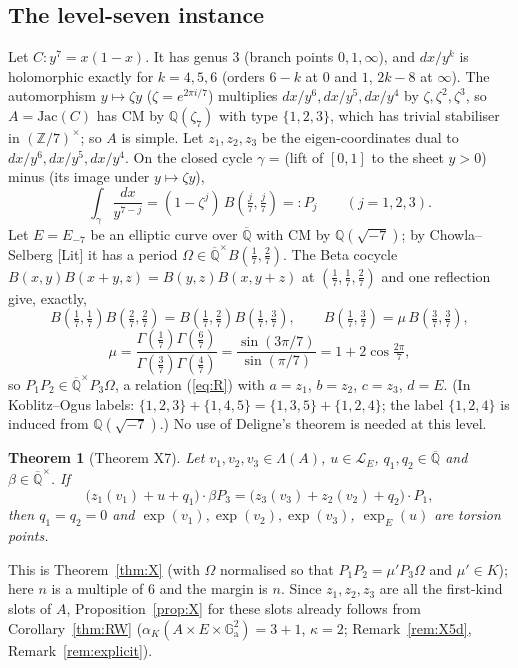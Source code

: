 \documentclass[11pt]{amsart}
\newtheorem{theorem}{Theorem}[section]
\theoremstyle{definition}
\newcommand{\Qb}{\overline{\mathbb{Q}}}
\newcommand{\Q}{\mathbb{Q}}
\newcommand{\Z}{\mathbb{Z}}
\newcommand{\Ga}{\mathbb{G}_{\mathrm a}}
\newcommand{\Lg}{\mathcal{L}}
\newcommand{\lab}[1]{\textup{[#1]}}
\begin{document}
\subsection{The level-seven instance}\label{sec:X7}
Let $C\colon y^7=x(1-x)$. It has genus $3$ (branch points $0,1,\infty$), and $dx/y^k$ is holomorphic exactly for
$k=4,5,6$ (orders $6-k$ at $0$ and $1$, $2k-8$ at $\infty$). The automorphism $y\mapsto\zeta y$ ($\zeta=e^{2\pi i/7}$)
multiplies $dx/y^6,dx/y^5,dx/y^4$ by $\zeta,\zeta^2,\zeta^3$, so $A=\mathrm{Jac}(C)$ has CM by $\Q(\zeta_7)$ with type
$\{1,2,3\}$, which has trivial stabiliser in $(\Z/7)^\times$; so $A$ is simple. Let $z_1,z_2,z_3$ be the eigen-coordinates
dual to $dx/y^6,dx/y^5,dx/y^4$. On the closed cycle $\gamma$ = (lift of $[0,1]$ to the sheet $y>0$) minus (its image under
$y\mapsto\zeta y$),
\[
\int_\gamma\frac{dx}{y^{7-j}}=(1-\zeta^{j})\,B(\tfrac j7,\tfrac j7)=:P_j\qquad(j=1,2,3).
\]
Let $E=E_{-7}$ be an elliptic curve over $\Qb$ with CM by $\Q(\sqrt{-7})$; by Chowla--Selberg \lab{Lit} \cite{Gr78} it has a period
$\Omega\in\Qb^\times B(\tfrac17,\tfrac27)$. The Beta cocycle $B(x,y)B(x+y,z)=B(y,z)B(x,y+z)$ at $(\tfrac17,\tfrac17,\tfrac27)$
and one reflection give, exactly,
\[
B(\tfrac17,\tfrac17)B(\tfrac27,\tfrac27)=B(\tfrac17,\tfrac27)B(\tfrac17,\tfrac37),\qquad
B(\tfrac17,\tfrac37)=\mu\,B(\tfrac37,\tfrac37),
\]
\[
\mu=\frac{\Gamma(\frac17)\Gamma(\frac67)}{\Gamma(\frac37)\Gamma(\frac47)}=\frac{\sin(3\pi/7)}{\sin(\pi/7)}=1+2\cos\tfrac{2\pi}7,
\]
so $P_1P_2\in\Qb^\times P_3\Omega$, a relation (\ref{eq:R}) with $a=z_1$, $b=z_2$, $c=z_3$, $d=E$. (In Koblitz--Ogus labels:
$\{1,2,3\}+\{1,4,5\}=\{1,3,5\}+\{1,2,4\}$; the label $\{1,2,4\}$ is induced from $\Q(\sqrt{-7})$.) No use of Deligne's theorem
is needed at this level.

\begin{theorem}[Theorem X7]\label{thm:X7}
Let $v_1,v_2,v_3\in\Lambda(A)$, $u\in\Lg_E$, $q_1,q_2\in\Qb$ and $\beta\in\Qb^\times$. If
\[
\bigl(z_1(v_1)+u+q_1\bigr)\cdot\beta P_3=\bigl(z_3(v_3)+z_2(v_2)+q_2\bigr)\cdot P_1,
\]
then $q_1=q_2=0$ and $\exp(v_1),\exp(v_2),\exp(v_3)$, $\exp_E(u)$ are torsion points.
\end{theorem}

\noindent This is Theorem~\ref{thm:X} (with $\Omega$ normalised so that $P_1P_2=\mu'P_3\Omega$ and $\mu'\in K$); here
$n$ is a multiple of $6$ and the margin is $n$. Since $z_1,z_2,z_3$ are all the first-kind slots of $A$,
Proposition~\ref{prop:X} for these slots already follows from Corollary~\ref{thm:RW}
($\alpha_K(A\times E\times\Ga^2)=3+1$, $\kappa=2$; Remark~\ref{rem:X5d}, Remark~\ref{rem:explicit}).
\end{document}
